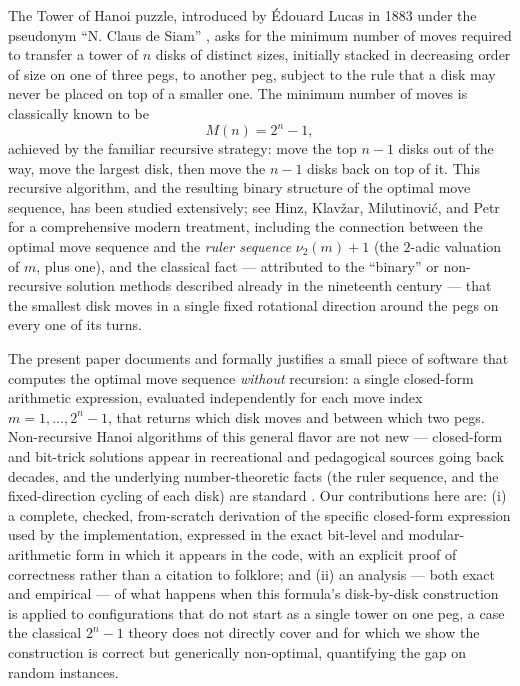 \documentclass[11pt]{article}
\begin{document}
The Tower of Hanoi puzzle, introduced by \'Edouard Lucas in 1883 under the
pseudonym ``N. Claus de Siam'' \cite{lucas1883}, asks for the minimum number
of moves required to transfer a tower of $n$ disks of distinct sizes,
initially stacked in decreasing order of size on one of three pegs, to
another peg, subject to the rule that a disk may never be placed on top of a
smaller one. The minimum number of moves is classically known to be
\[
  M(n) = 2^n - 1,
\]
achieved by the familiar recursive strategy: move the top $n-1$ disks out of
the way, move the largest disk, then move the $n-1$ disks back on top of it.
This recursive algorithm, and the resulting binary structure of the optimal
move sequence, has been studied extensively; see Hinz, Klav\v{z}ar,
Milutinovi\'c, and Petr \cite{hinz2018} for a comprehensive modern
treatment, including the connection between the optimal move sequence and
the \emph{ruler sequence} $\nu_2(m)+1$ (the $2$-adic valuation of $m$, plus
one), and the classical fact --- attributed to the ``binary'' or
non-recursive solution methods described already in the nineteenth century
\cite{lucas1883,hinz2018} --- that the smallest disk moves in a single fixed
rotational direction around the pegs on every one of its turns.

The present paper documents and formally justifies a small piece of software
that computes the optimal move sequence \emph{without} recursion: a single
closed-form arithmetic expression, evaluated independently for each move
index $m = 1, \dots, 2^n - 1$, that returns which disk moves and between
which two pegs. Non-recursive Hanoi algorithms of this general flavor are
not new --- closed-form and bit-trick solutions appear in recreational and
pedagogical sources going back decades, and the underlying number-theoretic
facts (the ruler sequence, and the fixed-direction cycling of each disk) are
standard \cite{hinz2018,graham1994}. Our contributions here are: (i) a
complete, checked, from-scratch derivation of the specific closed-form
expression used by the implementation, expressed in the exact bit-level and
modular-arithmetic form in which it appears in the code, with an explicit
proof of correctness rather than a citation to folklore; and (ii) an
analysis --- both exact and empirical --- of what happens when this
formula's disk-by-disk construction is applied to configurations that do
not start as a single tower on one peg, a case the classical $2^n-1$ theory
does not directly cover and for which we show the construction is correct
but generically non-optimal, quantifying the gap on random instances.
\end{document}
